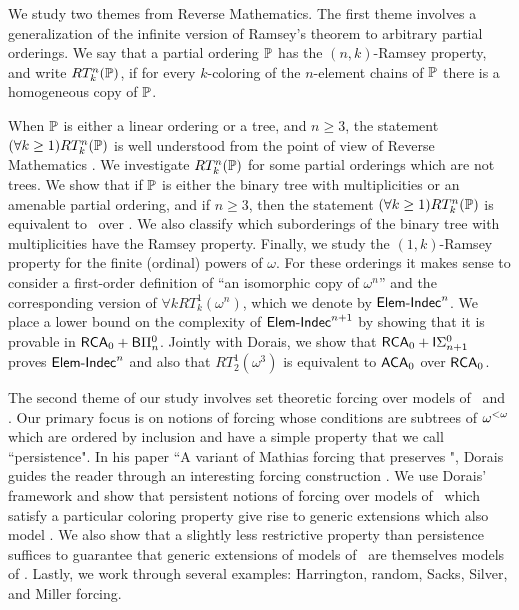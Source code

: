 We study two themes from Reverse Mathematics.
The first theme involves a generalization of the infinite version of
Ramsey's theorem to arbitrary partial orderings.
We say that a partial ordering $\mathbb{P}$ has the $(n,k)$-Ramsey property,
and write $RT^n_k(\mathbb{P})$,
if for every $k$-coloring of the $n$-element chains of $\mathbb{P}$
there is a homogeneous copy of $\mathbb{P}$.

When $\mathbb{P}$ is either a linear ordering or a tree, and $n\geq 3$, the statement
\newline $(\forall k\geq 1 )RT^n_k(\mathbb{P})$ is well understood
from the point of view of Reverse Mathematics \cite{CHM}\cite{CGM}.
We investigate $RT^n_k(\mathbb{P})$ for some partial orderings which are not trees.
We show that if $\mathbb{P}$ is either the binary tree with multiplicities
or an amenable partial ordering, and if $n\geq 3$,
then the statement $(\forall k\geq 1 )RT^n_k(\mathbb{P})$
is equivalent to \ACAo\ over \RCAo.
We also classify which suborderings of
the binary tree with multiplicities have the Ramsey property.
Finally, we study the $(1,k)$-Ramsey property for the finite (ordinal) powers of $\omega$.
For these orderings it makes sense to consider a first-order definition
of ``an isomorphic copy of $\omega^n$'' and the corresponding version of $\forall k RT^1_k(\omega^n)$,
which we denote by $\mathsf{Elem{\mbox{-}}Indec}^n$.
We place a lower bound on the complexity of $\mathsf{Elem{\mbox{-}}Indec}^{n+1}$ by showing that it
is provable in $\mathsf{RCA}_0+\mathsf{B}{\Pi^0_n}$.
Jointly with Dorais, we show that $\mathsf{RCA}_0+\mathsf{I}{\Sigma^0_{n+1}}$ proves $\mathsf{Elem{\mbox{-}}Indec}^{n}$
and also that $RT^1_2(\omega^3)$ is equivalent to $\mathsf{ACA}_0$ over $\mathsf{RCA}_0$.

The second theme of our study involves set theoretic forcing over
models of \RCAo\ and \ACAo.
Our primary focus is on notions of forcing whose conditions are
subtrees of $\omega^{<\omega}$ which are ordered by inclusion and have a simple property
that we call ``persistence".
In his paper ``A variant of Mathias forcing that
preserves \ACAo", Dorais guides the reader through an
interesting forcing construction \cite{varMathias}.
We use Dorais' framework and show that persistent notions of forcing
over models of \ACAo\ which satisfy a particular coloring property
give rise to generic extensions which also model \ACAo.
We also show that a slightly less restrictive property than persistence
suffices to guarantee that generic extensions of models of \RCAo\
are themselves models of \RCAo.
Lastly, we work through several examples:
Harrington, random, Sacks, Silver, and Miller forcing.
